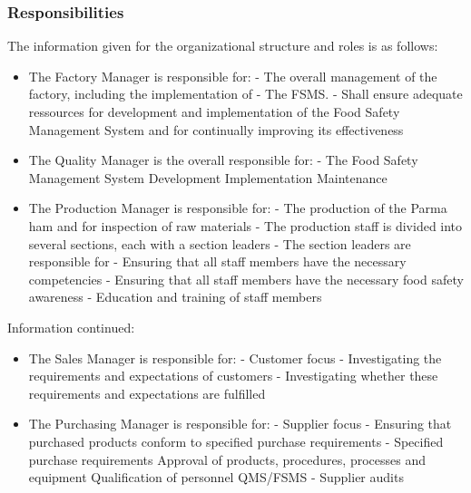 \subsubsection*{Responsibilities}
 
\begin{highlight}
    The information given for the organizational structure and roles is as follows:

\begin{itemize}
\item The Factory Manager is responsible for:
\subitem - The overall management of the factory, including the implementation of 
\subitem - The FSMS.
\subitem - Shall ensure adequate ressources for development and implementation of the Food Safety \subitem Management System and for continually improving its effectiveness

\item The Quality Manager is the overall responsible for:
\subitem - The Food Safety Management System
\subsubitem * Development
\subsubitem * Implementation
\subsubitem * Maintenance

\item The Production Manager is responsible for:
\subitem  - The production of the Parma ham and for inspection of raw materials
\subitem - The production staff is divided into
several sections, each with a section leaders
\subitem - The section leaders are responsible for
\subitem - Ensuring that all staff members have the necessary competencies
\subitem - Ensuring that all staff members
have the necessary food safety awareness
\subitem - Education and training of staff members

\end{itemize}
\end{highlight}

\begin{highlight}
    Information continued:
    \begin{itemize}
        \item The Sales Manager is responsible for:
        \subitem - Customer focus
        \subitem - Investigating the requirements and expectations of customers
        \subitem - Investigating whether these requirements and expectations are fulfilled

        \item The Purchasing Manager is responsible for:
        \subitem - Supplier focus
        \subitem - Ensuring that purchased products conform to specified purchase requirements
        \subitem - Specified purchase requirements
        \subsubitem * Approval of products, procedures, processes and equipment
        \subsubitem * Qualification of personnel
        \subsubitem * QMS/FSMS
        \subitem - Supplier audits

    \end{itemize}
\end{highlight}

